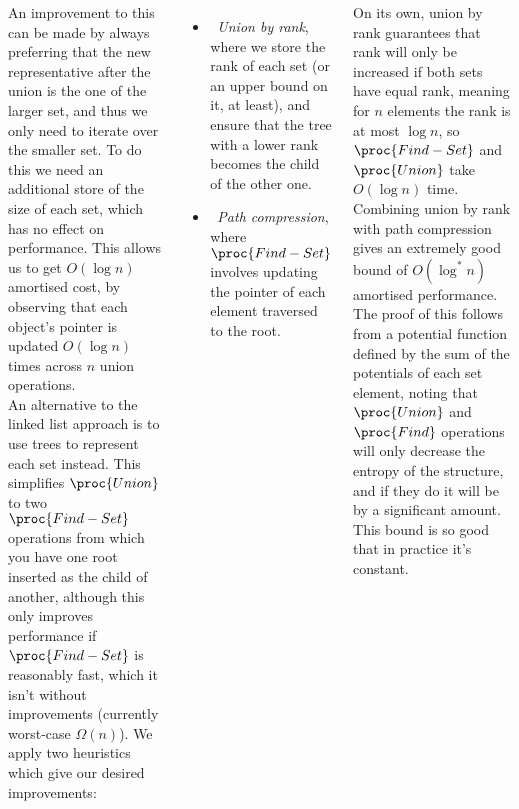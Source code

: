\documentclass{tikzposter} %
\begin{document}
\begin{columns}
{    An improvement to this can be made by always preferring that the new representative after the union is the one of the larger set, and thus we only need to iterate over the smaller set. To do this we need an additional store of the size of each set, which has no effect on performance. This allows us to get $O(\log n)$ amortised cost, by observing that each object's pointer is updated $O(\log n)$ times across $n$ union operations. \\

    An alternative to the linked list approach is to use trees to represent each set instead. This simplifies $\proc{Union}$ to two $\proc{Find-Set}$ operations from which you have one root inserted as the child of another, although this only improves performance if $\proc{Find-Set}$ is reasonably fast, which it isn't without improvements (currently worst-case $\Omega(n)$). We apply two heuristics which give our desired improvements:
    \begin{itemize}
    \item \ \emph{Union by rank}, where we store the rank of each set (or an upper bound on it, at least), and ensure that the tree with a lower rank becomes the child of the other one.
    \item \ \emph{Path compression}, where $\proc{Find-Set}$ involves updating the pointer of each element traversed to the root. \\
    \end{itemize}

    On its own, union by rank guarantees that rank will only be increased if both sets have equal rank, meaning for $n$ elements the rank is at most $\log n$, so $\proc{Find-Set}$ and $\proc{Union}$ take $O(\log n)$ time. \\

    Combining union by rank with path compression gives an extremely good bound of $O(\log^{*} n)$ amortised performance. The proof of this follows from a potential function defined by the sum of the potentials of each set element, noting that $\proc{Union}$ and $\proc{Find}$ operations will only decrease the entropy of the structure, and if they do it will be by a significant amount. This bound is so good that in practice it's constant. \\
  }


\end{columns}
\end{document}
